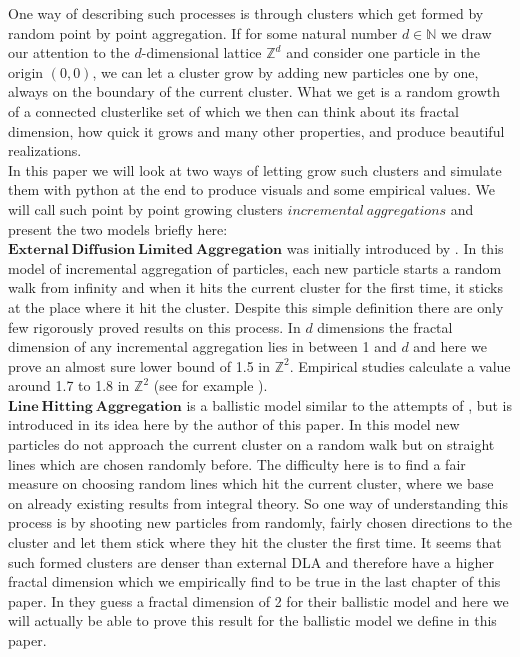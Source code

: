 \documentclass[12pt,a4paper]{scrartcl}
\newcommand{\Z}{\mathbb{Z}} %
\newcommand{\N}{\mathbb{N}} %
\newcommand{\1}{\mathbbm{1}}
\theoremstyle{definition}
\numberwithin{equation}{section}
\begin{document}
	\noindent One way of describing such processes is through clusters which get formed by random point by point aggregation. If for some natural number $d\in\N$ we draw our attention to the $d$-dimensional lattice $\Z^d$ and consider one particle in the origin $(0,0)$, we can let a cluster grow by adding new particles one by one, always on the boundary of the current cluster. What we get is a random growth of a connected clusterlike set of which we then can think about its fractal dimension, how quick it grows and many other properties, and produce beautiful realizations. \\
	
	\noindent In this paper we will look at two ways of letting grow such clusters and simulate them with python at the end to produce visuals and some empirical values. We will call such point by point growing clusters $\mathit{incremental\ aggregations}$ and present the two models briefly here:\\

	\noindent $\mathbf{External\ Diffusion\ Limited\ Aggregation}$ was initially introduced by \cite[Witten and Sander, 1983]{wittensander}. In this model of incremental aggregation of particles, each new particle starts a random walk from infinity and when it hits the current cluster for the first time, it sticks at the place where it hit the cluster. Despite this simple definition there are only few rigorously proved results on this process. In $d$ dimensions the fractal dimension of any incremental aggregation lies in between 1 and $d$ and here we prove an almost sure lower bound of 1.5 in $\Z^2$. Empirical studies calculate a value around 1.7 to 1.8 in $\Z^2$ (see for example \cite{magnetic}).  \\
	
	\noindent $\mathbf{Line\ Hitting\ Aggregation}$ is a ballistic model similar to the attempts of \cite{ballistic}, but is introduced in its idea here by the author of this paper. In this model new particles do not approach the current cluster on a random walk but on straight lines which are chosen randomly before. The difficulty here is to find a fair measure on choosing random lines which hit the current cluster, where we base on already existing results from integral theory. So one way of understanding this process is by shooting new particles from randomly, fairly chosen directions to the cluster and let them stick where they hit the cluster the first time. It seems that such formed clusters are denser than external DLA and therefore have a higher fractal dimension which we empirically find to be true in the last chapter of this paper. In \cite{ballistic} they guess a fractal dimension of 2 for their ballistic model and here we will actually be able to prove this result for the ballistic model we define in this paper. \\
	
\end{document}
